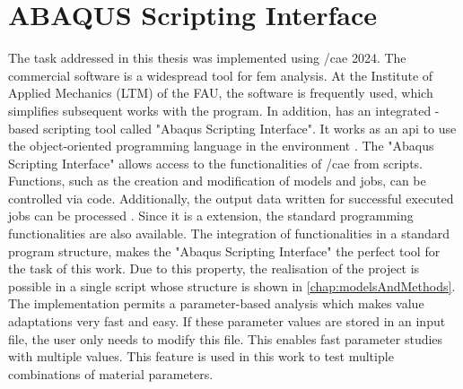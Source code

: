 \section{ABAQUS Scripting Interface} \label{sec: AbaqusBasics}

The task addressed in this thesis was implemented using /\acrshort{cae} 2024. The commercial software is a widespread tool for \acrshort{fem} analysis. At the Institute of Applied Mechanics (LTM) of the FAU, the software is frequently used, which simplifies subsequent works with the program. In addition,  has an integrated -based scripting tool called "Abaqus Scripting Interface". It works as an \acrfull{api} to use the object-oriented programming language  in the  environment \cite{dassault_systems_abaqus_2015-1}. The "Abaqus Scripting Interface" allows access to the functionalities of /\acrshort{cae} from scripts. Functions, such as the creation and modification of models and jobs, can be controlled via code. Additionally, the output data written for successful executed jobs can be processed \cite{dassault_systems_abaqus_2015-1}. Since it is a  extension, the standard programming functionalities are also available. The integration of  functionalities in a standard program structure, makes the "Abaqus Scripting Interface" the perfect tool for the task of this work. Due to this property, the realisation of the project is possible in a single script whose structure is shown in \autoref{chap:modelsAndMethods}. The implementation permits a parameter-based analysis which makes value adaptations very fast and easy. If these parameter values are stored in an input file, the user only needs to modify this file. This enables fast parameter studies with multiple values. This feature is used in this work to test multiple combinations of material parameters.  





